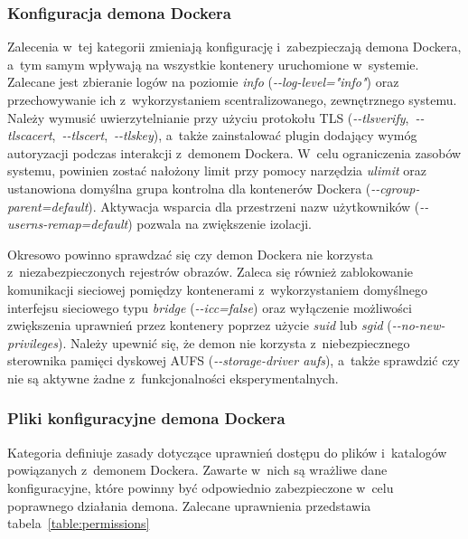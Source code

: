 \subsubsection{Konfiguracja demona Dockera}

Zalecenia w~tej kategorii zmieniają konfigurację i~zabezpieczają demona Dockera, a~tym samym wpływają na wszystkie kontenery uruchomione w~systemie. Zalecane jest zbieranie logów na poziomie \textit{info} (\textit{-{}-log-level="info"}) oraz przechowywanie ich z~wykorzystaniem scentralizowanego, zewnętrznego systemu. Należy wymusić uwierzytelnianie przy użyciu protokołu TLS (\textit{-{}-tlsverify},~\textit{-{}-tlscacert},~\textit{-{}-tlscert},~\textit{-{}-tlskey}), a~także zainstalować plugin dodający wymóg autoryzacji podczas interakcji z~demonem Dockera. W~celu ograniczenia zasobów systemu, powinien zostać nałożony limit przy pomocy narzędzia \textit{ulimit} oraz ustanowiona domyślna grupa kontrolna dla kontenerów Dockera (\textit{-{}-cgroup-parent=default}). Aktywacja wsparcia dla przestrzeni nazw użytkowników (\textit{-{}-userns-remap=default}) pozwala na zwiększenie izolacji.

Okresowo powinno sprawdzać się czy demon Dockera nie korzysta z~niezabezpieczonych rejestrów obrazów. Zaleca się również zablokowanie komunikacji sieciowej pomiędzy kontenerami z~wykorzystaniem domyślnego interfejsu sieciowego typu \textit{bridge} (\textit{-{}-icc=false}) oraz wyłączenie możliwości zwiększenia uprawnień przez kontenery poprzez użycie \textit{suid} lub \textit{sgid} (\textit{-{}-no-new-privileges}). Należy upewnić się, że demon nie korzysta z~niebezpiecznego sterownika pamięci dyskowej AUFS (\textit{-{}-storage-driver aufs}), a~także sprawdzić czy nie są aktywne żadne z~funkcjonalności eksperymentalnych.

\subsubsection{Pliki konfiguracyjne demona Dockera}

Kategoria definiuje zasady dotyczące uprawnień dostępu do plików i~katalogów powiązanych z~demonem Dockera. Zawarte w~nich są wrażliwe dane konfiguracyjne, które powinny być odpowiednio zabezpieczone w~celu poprawnego działania demona. Zalecane uprawnienia przedstawia tabela~\ref{table:permissions}

